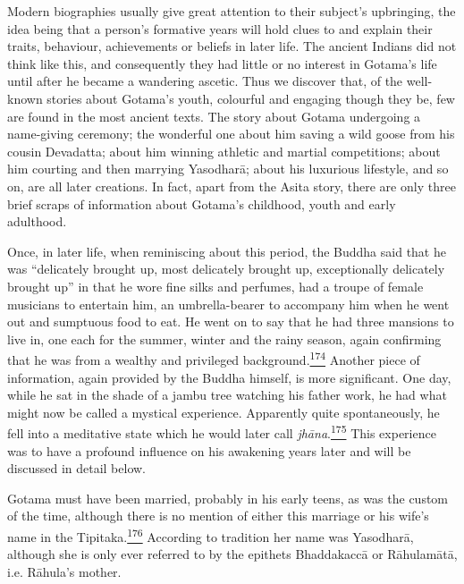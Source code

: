 Modern biographies usually give great attention to their subject's
upbringing, the idea being that a person's formative years will hold
clues to and explain their traits, behaviour, achievements or beliefs in
later life. The ancient Indians did not think like this, and
consequently they had little or no interest in Gotama's life until after
he became a wandering ascetic. Thus we discover that, of the well-known
stories about Gotama's youth, colourful and engaging though they be, few
are found in the most ancient texts. The story about Gotama undergoing a
name-giving ceremony; the wonderful one about him saving a wild goose
from his cousin Devadatta; about him winning athletic and martial
competitions; about him courting and then marrying Yasodharā; about his
luxurious lifestyle, and so on, are all later creations. In fact, apart
from the Asita story, there are only three brief scraps of information
about Gotama's childhood, youth and early adulthood.

Once, in later life, when reminiscing about this period, the Buddha said
that he was ``delicately brought up, most delicately brought up,
exceptionally delicately brought up'' in that he wore fine silks and
perfumes, had a troupe of female musicians to entertain him, an
umbrella-bearer to accompany him when he went out and sumptuous food to
eat. He went on to say that he had three mansions to live in, one each
for the summer, winter and the rainy season, again confirming that he
was from a wealthy and privileged
background.\label{footprints_split_009.html_fnref174}\hyperref[footprints_split_024.htmlux5cux23fn174]{\textsuperscript{174}}
Another piece of information, again provided by the Buddha himself, is
more significant. One day, while he sat in the shade of a jambu tree
watching his father work, he had what might now be called a mystical
experience. Apparently quite spontaneously, he fell into a meditative
state which he would later call
\emph{jhāna}.\label{footprints_split_009.html_fnref175}\hyperref[footprints_split_024.htmlux5cux23fn175]{\textsuperscript{175}}
This experience was to have a profound influence on his awakening years
later and will be discussed in detail below.

Gotama must have been married, probably in his early teens, as was the
custom of the time, although there is no mention of either this marriage
or his wife's name in the
Tipitaka.\label{footprints_split_009.html_fnref176}\hyperref[footprints_split_024.htmlux5cux23fn176]{\textsuperscript{176}}
According to tradition her name was Yasodharā, although she is only ever
referred to by the epithets Bhaddakaccā or Rāhulamātā, i.e. Rāhula's
mother.

